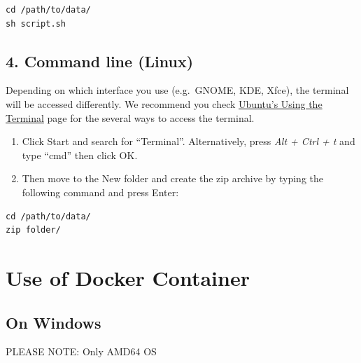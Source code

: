 \documentclass[
  a4paper,
  DIV=11,
  numbers=noendperiod,
  oneside,
  open=any]{scrreport}
\providecommand{\tightlist}{%
  \setlength{\itemsep}{0pt}\setlength{\parskip}{0pt}}\usepackage{longtable,booktabs,array}
\begin{document}
\begin{verbatim}
cd /path/to/data/
sh script.sh
\end{verbatim}

\section{4. Command line (Linux)}\label{command-line-linux}

Depending on which interface you use (e.g.~GNOME, KDE, Xfce), the
terminal will be accessed differently. We recommend you check
\href{https://help.ubuntu.com/community/UsingTheTerminal?action=show&redirect=BasicCommands}{Ubuntu's
Using the Terminal} page for the several ways to access the terminal.

\begin{enumerate}
\def\labelenumi{\arabic{enumi}.}
\tightlist
\item
  Click Start and search for ``Terminal''. Alternatively, press
  \emph{Alt + Ctrl + t} and type ``cmd'' then click OK.
\item
  Then move to the New folder and create the zip archive by typing the
  following command and press Enter:
\end{enumerate}

\begin{verbatim}
cd /path/to/data/
zip folder/
\end{verbatim}

\chapter{Use of Docker Container}\label{sec-docker}

\section{On Windows}\label{on-windows}

\begin{tcolorbox}[enhanced jigsaw, breakable, colback=white, colbacktitle=quarto-callout-caution-color!10!white, opacityback=0, left=2mm, bottomrule=.15mm, opacitybacktitle=0.6, coltitle=black, bottomtitle=1mm, toprule=.15mm, toptitle=1mm, arc=.35mm, titlerule=0mm, rightrule=.15mm, title=\textcolor{quarto-callout-caution-color}{\faFire}\hspace{0.5em}{Caution}, colframe=quarto-callout-caution-color-frame, leftrule=.75mm]

PLEASE NOTE: Only AMD64 OS

\end{tcolorbox}
\end{document}
